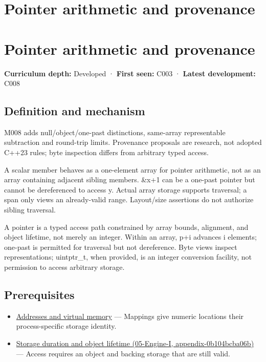 \hypertarget{appendix-6af5921bc853}{}
\section*{Pointer arithmetic and provenance}
\section{Pointer arithmetic and provenance}\label{pointer-arithmetic-and-provenance}

\textbf{Curriculum depth:} Developed · \textbf{First seen:} C003 · \textbf{Latest development:} C008

\subsection{Definition and mechanism}\label{definition-and-mechanism}

M008 adds null/object/one-past distinctions, same-array representable subtraction and round-trip limits. Provenance proposals are research, not adopted C++23 rules; byte inspection differs from arbitrary typed access.

A scalar member behaves as a one-element array for pointer arithmetic, not as an array containing adjacent sibling members. \&x+1 can be a one-past pointer but cannot be dereferenced to access y. Actual array storage supports traversal; a span only views an already-valid range. Layout/size assertions do not authorize sibling traversal.

A pointer is a typed access path constrained by array bounds, alignment, and object lifetime, not merely an integer. Within an array, p+i advances i elements; one-past is permitted for traversal but not dereference. Byte views inspect representations; uintptr\_t, when provided, is an integer conversion facility, not permission to access arbitrary storage.

\subsection{Prerequisites}\label{prerequisites}

\begin{itemize}
\tightlist
\item
  \hyperref[appendix-18ee4f913c3c]{Addresses and virtual memory} --- Mappings give numeric locations their process-specific storage identity.
\item
  \href{}{Storage duration and object lifetime (05-Engine-I, appendix-0b104bcba06b)} --- Access requires an object and backing storage that are still valid.
\end{itemize}


